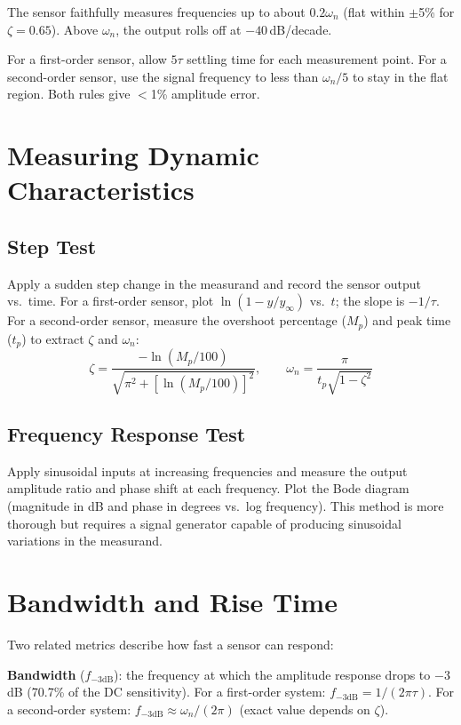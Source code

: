 \documentclass[11pt,letterpaper,twoside,openany]{book}
\begin{document}
The sensor faithfully measures frequencies up to about $0.2\omega_n$ (flat within $\pm$5\% for $\zeta = 0.65$). Above $\omega_n$, the output rolls off at $-40$\,dB/decade.

\begin{tipbox}
For a first-order sensor, allow $5\tau$ settling time for each measurement point. For a second-order sensor, use the signal frequency to less than $\omega_n / 5$ to stay in the flat region. Both rules give $<$1\% amplitude error.
\end{tipbox}

\section{Measuring Dynamic Characteristics}

\subsection{Step Test}
Apply a sudden step change in the measurand and record the sensor output vs.\ time. For a first-order sensor, plot $\ln(1 - y/y_{\infty})$ vs.\ $t$; the slope is $-1/\tau$. For a second-order sensor, measure the overshoot percentage ($M_p$) and peak time ($t_p$) to extract $\zeta$ and $\omega_n$:
\begin{equation}
\zeta = \frac{-\ln(M_p/100)}{\sqrt{\pi^2 + [\ln(M_p/100)]^2}}, \qquad \omega_n = \frac{\pi}{t_p \sqrt{1 - \zeta^2}}
\end{equation}

\subsection{Frequency Response Test}
Apply sinusoidal inputs at increasing frequencies and measure the output amplitude ratio and phase shift at each frequency. Plot the Bode diagram (magnitude in dB and phase in degrees vs.\ log frequency). This method is more thorough but requires a signal generator capable of producing sinusoidal variations in the measurand.


\section{Bandwidth and Rise Time}
Two related metrics describe how fast a sensor can respond:

\textbf{Bandwidth} ($f_{-3\text{dB}}$): the frequency at which the amplitude response drops to $-3$\,dB (70.7\% of the DC sensitivity). For a first-order system: $f_{-3\text{dB}} = 1/(2\pi\tau)$. For a second-order system: $f_{-3\text{dB}} \approx \omega_n / (2\pi)$ (exact value depends on $\zeta$).
\end{document}
